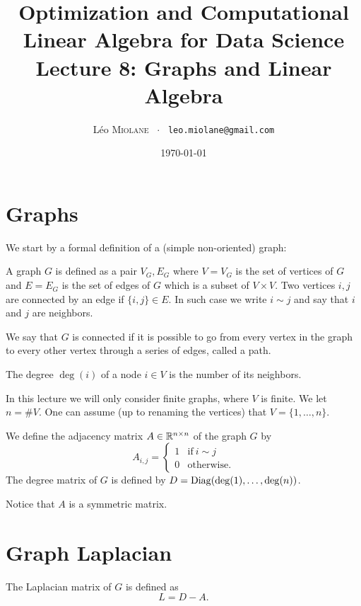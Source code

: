 \documentclass[11pt,nocut]{article}
\title{\vspace{-2.0cm}%
	Optimization and Computational Linear Algebra for Data Science\\
Lecture 8: Graphs and Linear Algebra}
\author{Léo \textsc{Miolane} \ $\cdot$ \ \texttt{leo.miolane@gmail.com}}
\date{\today}
\begin{document}
\maketitle


\section{Graphs}

We start by a formal definition of a (simple non-oriented) graph:
\begin{definition}[Graph]
	A graph $G$ is defined as a pair $V_G,E_G$ where $V=V_G$ is the set of vertices of $G$ and $E = E_G$ is the set of edges of $G$ which is a subset of $V \times V$.
	Two vertices $i,j$ are connected by an edge if $\{i,j\} \in E$. In such case we write $i \sim j$ and say that $i$ and $j$ are neighbors.
\end{definition}

We say that $G$ is connected if it is possible to go from every vertex in the graph to every other vertex through a series of edges, called a path.

\begin{definition}
	The degree $\deg(i)$ of a node $i \in V$ is the number of its neighbors.
\end{definition}

In this lecture we will only consider finite graphs, where $V$ is finite. We let $n = \# V$. One can assume (up to renaming the vertices) that $V = \{1, \dots, n\}$.

\begin{definition}
	We define the adjacency matrix $A \in \mathbb{R}^{n \times n}$ of the graph $G$ by
	$$
	A_{i,j} = 
	\begin{cases}
		1 & \text{if} \ i \sim j \\
		0 & \text{otherwise.}
	\end{cases}
	$$
	The degree matrix of $G$ is defined by $D = {{\rm Diag}}({\rm deg}(1), \dots, {\rm deg}(n))$. 
\end{definition}

Notice that $A$ is a symmetric matrix.

\section{Graph Laplacian}

\begin{definition}
	The Laplacian matrix of $G$ is defined as
	$$
	L = D - A.
	$$
\end{definition}
\end{document}
